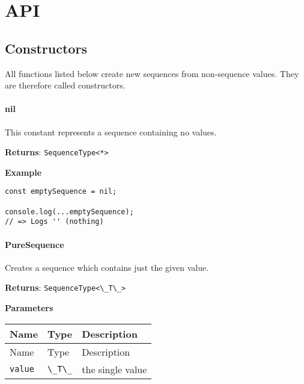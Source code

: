 \newcommand{\passthrough}[1]{#1}

\providecommand{\tightlist}{%
  \setlength{\itemsep}{0pt}\setlength{\parskip}{0pt}}
\hypertarget{api}{%
\chapter{API}\label{api}}

\hypertarget{fa229d10-532a-4f04-9805-8fdc4881587a}{%
\section{Constructors}
\label{sec:appendix_ctor}}

All functions listed below create new sequences from non-sequence
values. They are therefore called constructors.

\hypertarget{eb038883-6cbc-4daf-ad04-f8c2e25f9a33}{%
\subsubsection{nil}\label{eb038883-6cbc-4daf-ad04-f8c2e25f9a33}}

This constant represents a sequence containing no values.

\textbf{Returns}: \passthrough{\lstinline!SequenceType<*>!}

\textbf{Example}

\begin{lstlisting}[label=5c45c9fa-4663-4eae-8965-8bea240591b4]
const emptySequence = nil;
                              
console.log(...emptySequence);
// => Logs '' (nothing)
\end{lstlisting}

\hypertarget{c35d49b1-5a40-4fb7-b9cd-225357873654}{%
\subsubsection{PureSequence}\label{c35d49b1-5a40-4fb7-b9cd-225357873654}}

Creates a sequence which contains just the given value.

\textbf{Returns}: \passthrough{\lstinline!SequenceType<\_T\_>!}

\textbf{Parameters}

\begin{longtable}[]{
  >{\raggedright\arraybackslash}p{}
  >{\raggedright\arraybackslash}p{}
  >{\raggedright\arraybackslash}p{}@{}}

\toprule\noalign{}
Name & Type & Description \\
\midrule\noalign{}
\endfirsthead
\toprule\noalign{}
Name & Type & Description \\
\midrule\noalign{}
\endhead
\bottomrule\noalign{}
\endlastfoot
\passthrough{\lstinline!value!} & \passthrough{\lstinline!\_T\_!} & the
single value \\
\end{longtable}

